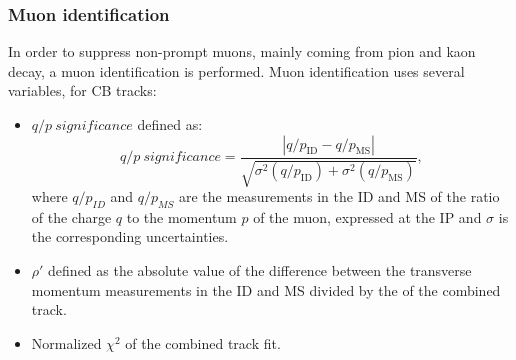 \subsubsection{Muon identification}
\label{chap2:Objects:Muon:ID}
In order to suppress non-prompt muons, mainly coming from pion and kaon decay, a muon identification is performed. Muon identification uses several variables, for CB tracks:
\begin{itemize}
    \item $q/p \ significance$ defined as: 
    \begin{equation}
        q / p \ significance=\frac{\left|q / p_{\mathrm{ID}}-q / p_{\mathrm{MS}}\right|}{\sqrt{\sigma^{2}\left(q / p_{\mathrm{ID}}\right)+\sigma^{2}\left(q / p_{\mathrm{MS}}\right)}},
    \end{equation}
    where $q/p_{ID}$ and $q/p_{MS}$ are the measurements in the ID and MS of the ratio of the charge $q$ to the momentum $p$ of the muon, expressed at the IP and $\sigma$ is the corresponding uncertainties. 
    \item $\rho'$ defined as the absolute value of the difference between the transverse momentum measurements in the ID and MS divided by the \pT of the combined track.
    \item Normalized $\chi^2$ of the combined track fit. 
\end{itemize}

